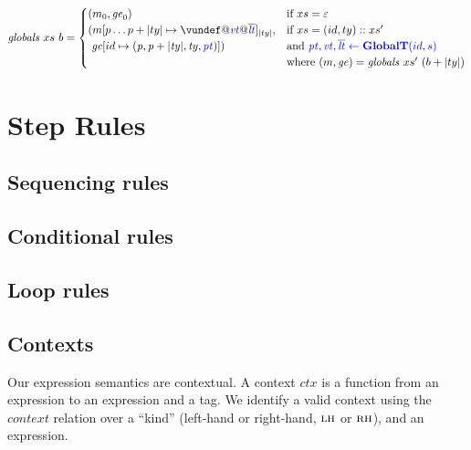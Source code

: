 \documentclass{llncs}
\begin{document}

\[\mathit{globals} ~ xs ~ b =
\begin{cases}
  (\mem_0, \genv_0) & \textnormal{if } xs = \varepsilon \\
  (\mem[p \dots p+|ty| \mapsto \vundef@\vt@\overline{\lt}]_{|ty|}, & \textnormal{if } xs = (id,ty)::xs' \\
  ~ \genv[id \mapsto (\mathit{p, p+|ty|,ty,\pt})]) & \textnormal{and } \trule{\globaltres}{\globalt} \\
  & \textnormal{where } (\mem,\genv) = \mathit{globals} ~ xs' ~ (b + |ty|) \\
\end{cases}\]

\section{Step Rules}
\label{app:rules}

\subsection{Sequencing rules}

\sequencing

\subsection{Conditional rules}

\conditionals

\subsection{Loop rules}

\loops

\subsection{Contexts}
\label{app:contexts}

Our expression semantics are contextual. A context \(\mathit{ctx}\) is a function from an
expression to an expression and a tag. We identify a valid context using the \(\mathit{context}\)
relation over a ``kind'' (left-hand or right-hand, \(\textnormal{\sc lh}\) or \(\textnormal{\sc rh}\)),
and an expression.
\end{document}
